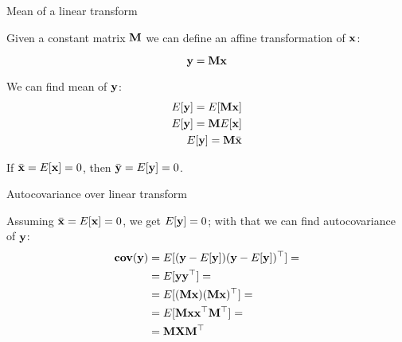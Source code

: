 \documentclass{beamer}
\begin{document}
\begin{frame}{Mean of a linear transform}
	\begin{flushleft}
		
		Given a constant matrix $\mathbf{M}$ we can define an affine transformation of $\mathbf{x}$:
		
		\begin{equation}
			\mathbf{y} = \mathbf{M}\mathbf{x}
		\end{equation}
		
		We can find mean of $\mathbf{y}$:
		\begin{align}
			E[\mathbf{y}] = E[\mathbf{M}\mathbf{x}] \\
			E[\mathbf{y}] = \mathbf{M}E[\mathbf{x}] \\
			E[\mathbf{y}] = \mathbf{M}\bar{\mathbf{x}}
		\end{align}
		
		If $\bar{\mathbf{x}} = E[\mathbf{x}] = 0$, then $\bar{\mathbf{y}} = E[\mathbf{y}] = 0$.
		
	\end{flushleft}
\end{frame}



\begin{frame}{Autocovariance over linear transform}
	\begin{flushleft}
		
		Assuming $\bar{\mathbf{x}} = E[\mathbf{x}] = 0$, we get $E[\mathbf{y}] = 0$; with that we can find autocovariance of $\mathbf{y}$:
		\begin{align*}
			\textbf{cov}(\mathbf{y}) &= E[(\mathbf{y} - E[\mathbf{y}])(\mathbf{y} - E[\mathbf{y}])^\top] =
			\\
			&=E[\mathbf{y}\mathbf{y}^\top] =
			\\
			&=E[(\mathbf{M}\mathbf{x})(\mathbf{M}\mathbf{x})^\top]=
			\\
			&=E[\mathbf{M}\mathbf{x}\mathbf{x}^\top \mathbf{M}^\top]=
			\\
			&=\mathbf{M}\mathbf{X} \mathbf{M}^\top
		\end{align*}
		
	\end{flushleft}
\end{frame}
\end{document}

